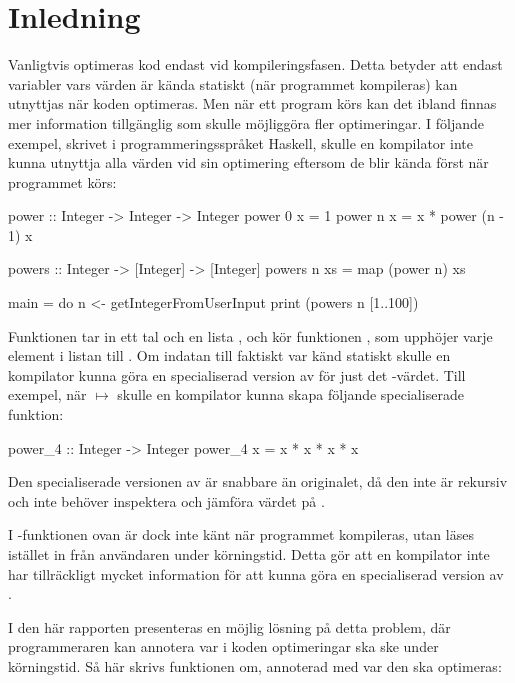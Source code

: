 \documentclass[Rapport]{subfiles}
\begin{document}
\chapter{Inledning}

Vanligtvis optimeras kod endast vid kompileringsfasen. Detta betyder att endast variabler
vars värden är kända statiskt (när programmet kompileras) kan utnyttjas när koden optimeras. Men när ett program 
körs kan det ibland finnas mer information tillgänglig som skulle möjliggöra 
fler optimeringar. I följande exempel, skrivet
i programmeringsspråket Haskell, skulle en kompilator inte kunna
utnyttja alla värden vid sin optimering eftersom de blir kända först när programmet körs:

\begin{codeEx}
power :: Integer -> Integer -> Integer
power 0 x = 1
power n x = x * power (n - 1) x

powers :: Integer -> [Integer] -> [Integer]
powers n xs = map (power n) xs

main = do
    n <- getIntegerFromUserInput
    print (powers n [1..100])

\end{codeEx}

Funktionen  tar in ett tal 
och en lista , och kör funktionen , 
som upphöjer varje element i listan till . 
Om indatan  till 
 faktiskt var känd statiskt skulle en kompilator kunna 
göra en specialiserad version av  för just det -värdet. Till exempel, när  $\mapsto$ 
skulle en kompilator kunna skapa följande specialiserade funktion:

\begin{codeEx}
power_4 :: Integer -> Integer
power_4 x = x * x * x * x
\end{codeEx}

Den specialiserade versionen av  är snabbare än originalet, då den inte är 
rekursiv och inte behöver inspektera och jämföra värdet på .

I -funktionen ovan är dock  inte känt när programmet kompileras, utan läses 
istället in från användaren under körningstid. Detta gör att en kompilator inte 
har tillräckligt mycket information för att kunna göra en specialiserad version av .

I den här rapporten presenteras en möjlig lösning på detta problem,
där programmeraren kan annotera var i koden optimeringar ska ske under körningstid.
Så här skrivs funktionen  om,
annoterad med var den ska optimeras:
\end{document}
